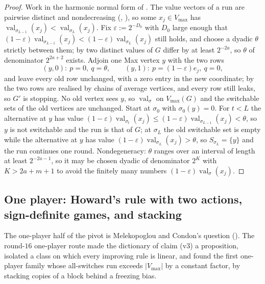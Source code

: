 \documentclass[11pt]{article}
\theoremstyle{plain}
\theoremstyle{definition}
\DeclareMathOperator{\val}{val}
\newcommand{\Vmax}{V_{\max}}
\begin{document}
\begin{proof}
Work in the harmonic normal form of . The value
vectors of a run are pairwise distinct and nondecreasing
(, ), so some $x_j\in\Vmax$ has
$\val_{\sigma_{L-1}}(x_j)<\val_{\sigma_L}(x_j)$. Fix
$\varepsilon:=2^{-D_0}$ with $D_0$ large enough that
$(1-\varepsilon)\val_{\sigma_{L-1}}(x_j)<(1-\varepsilon)\val_{\sigma_L}(x_j)$
still holds, and choose a dyadic $\theta$ strictly between them; by
 two distinct values of $G$ differ by at least
$2^{-2a}$, so $\theta$ of denominator $2^{2a+2}$ exists. Adjoin one Max
vertex $y$ with the two rows
\[
  (y,0):\ p=0,\ q=\theta,\qquad (y,1):\ p=(1-\varepsilon)e_j,\ q=0,
\]
and leave every old row unchanged, with a zero entry in the new
coordinate; by  the two rows are realised by chains
of average vertices, and every row still leaks, so $G'$ is stopping. No
old vertex sees $y$, so $\val_\sigma$ on $\Vmax(G)$ and the switchable
sets of the old vertices are unchanged. Start at $\sigma_0$ with
$\sigma_0(y)=0$. For $t<L$ the alternative at $y$ has value
$(1-\varepsilon)\val_{\sigma_t}(x_j)\le
(1-\varepsilon)\val_{\sigma_{L-1}}(x_j)<\theta$, so $y$ is not switchable
and the run is that of $G$; at $\sigma_L$ the old switchable set is empty
while the alternative at $y$ has value
$(1-\varepsilon)\val_{\sigma_L}(x_j)>\theta$, so $S_{\sigma_L}=\{y\}$ and
the run continues one round. Nondegeneracy: $\theta$ ranges over an
interval of length at least $2^{-2a-1}$, so it may be chosen dyadic of
denominator $2^{K}$ with $K>2a+m+1$ to avoid the finitely many numbers
$(1-\varepsilon)\val_\sigma(x_j)$.
\end{proof}

\subsection{One player: Howard's rule with two actions, sign-definite games, and stacking}\label{sec:oneplayer-howard}

The one-player half of the pivot is Melekopoglou and Condon's question
(). The round-$16$ one-player route made the dictionary
of claim (v3) a proposition, isolated a class on which every improving
rule is linear, and found the first one-player family whose all-switches
run exceeds $|\Vmax|$ by a constant factor, by stacking copies of a block
behind a freezing bias.
\end{document}
